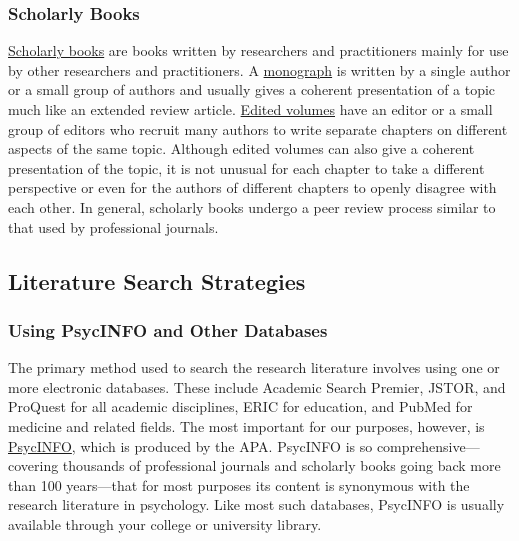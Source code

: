 \documentclass[
]{krantz}
\begin{document}
\subsubsection*{Scholarly Books}\label{scholarly-books}


\hyperref[scholarly-book]{Scholarly books} are books written by researchers and practitioners mainly for use by other researchers and practitioners. A \hyperref[monograph]{monograph} is written by a single author or a small group of authors and usually gives a coherent presentation of a topic much like an extended review article. \hyperref[edited-volume]{Edited volumes} have an editor or a small group of editors who recruit many authors to write separate chapters on different aspects of the same topic. Although edited volumes can also give a coherent presentation of the topic, it is not unusual for each chapter to take a different perspective or even for the authors of different chapters to openly disagree with each other. In general, scholarly books undergo a peer review process similar to that used by professional journals.

\subsection*{Literature Search Strategies}\label{literature-search-strategies}


\subsubsection*{Using PsycINFO and Other Databases}\label{using-psycinfo-and-other-databases}


The primary method used to search the research literature involves using one or more electronic databases. These include Academic Search Premier, JSTOR, and ProQuest for all academic disciplines, ERIC for education, and PubMed for medicine and related fields. The most important for our purposes, however, is \hyperref[psycinfo]{PsycINFO}, which is produced by the APA. PsycINFO is so comprehensive---covering thousands of professional journals and scholarly books going back more than 100 years---that for most purposes its content is synonymous with the research literature in psychology. Like most such databases, PsycINFO is usually available through your college or university library.
\end{document}
